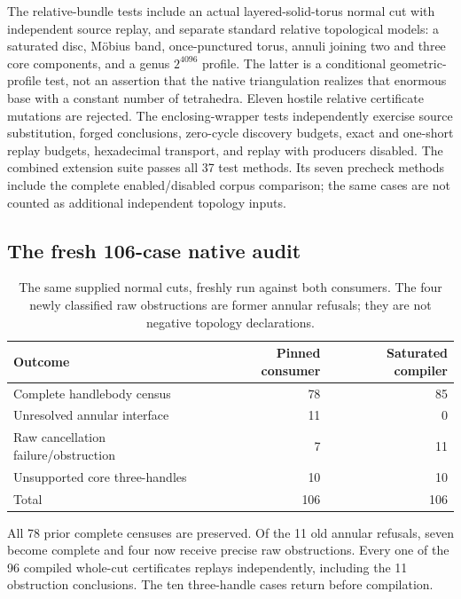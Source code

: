 The relative-bundle tests include an actual layered-solid-torus normal cut
with independent source replay, and separate standard relative topological
models: a saturated disc, M\"obius band, once-punctured torus, annuli
joining two and three core components, and a genus $2^{4096}$ profile.
The latter is a conditional geometric-profile test, not an assertion that
the native triangulation realizes that enormous base with a constant number
of tetrahedra.  Eleven hostile relative certificate mutations are rejected.
The enclosing-wrapper tests independently exercise source substitution,
forged conclusions, zero-cycle discovery budgets, exact and one-short
replay budgets, hexadecimal transport, and replay with producers disabled.
The combined extension suite passes all 37 test methods.  Its seven
precheck methods include the complete enabled/disabled corpus comparison;
the same cases are not counted as additional independent topology inputs.

\subsection{The fresh 106-case native audit}

\begin{table}[htbp]
\centering\small
\begin{tabular}{@{}lrr@{}}
\toprule
Outcome & Pinned consumer & Saturated compiler\\
\midrule
Complete handlebody census & 78 & 85\\
Unresolved annular interface & 11 & 0\\
Raw cancellation failure/obstruction & 7 & 11\\
Unsupported core three-handles & 10 & 10\\
\midrule
Total & 106 & 106\\
\bottomrule
\end{tabular}
\caption{The same supplied normal cuts, freshly run against both consumers.
The four newly classified raw obstructions are former annular refusals;
they are not negative topology declarations.}
\end{table}

All 78 prior complete censuses are preserved.  Of the 11 old annular
refusals, seven become complete and four now receive precise raw
obstructions.  Every one of the 96 compiled whole-cut certificates replays
independently, including the 11 obstruction conclusions.  The ten
three-handle cases return before compilation.

